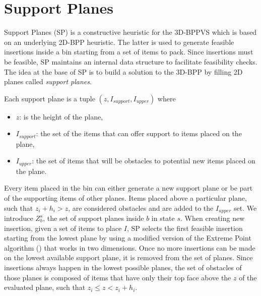 \section{Support Planes}
\label{sec:support_planes}%
Support Planes (SP) is a constructive heuristic for the 3D-BPPVS which is based on an underlying 2D-BPP heuristic. The latter is used to generate feasible insertions inside a bin starting from a set of items to pack.
Since insertions must be feasible, SP maintains an internal data structure to facilitate feasibility checks.
The idea at the base of SP is to build a solution to the 3D-BPP by filling 2D planes called \textit{support planes}.

Each support plane is a tuple $(z, I_{support}, I_{upper})$ where
\begin{itemize}
    \item $z$: is the height of the plane,
    \item $I_{support}$: the set of the items that can offer support to items placed on the plane,
    \item $I_{upper}$: the set of items that will be obstacles to potential new items placed on the plane.
\end{itemize}

Every item placed in the bin can either generate a new support plane or be part of the supporting items of other planes.
Items placed above a particular plane, such that $z_i + h_i > z$, are considered obstacles and are added to the $I_{upper}$ set.
We introduce $Z^s_b$, the set of support planes inside $b$ in state $s$.
When creating new insertion, given a set of items to place $I$, SP selects the first feasible insertion starting from the lowest plane by using a modified version of the Extreme Point algorithm (\cite{crainic2008extreme}) that works in two dimensions.
Once no more insertions can be made on the lowest available support plane, it is removed from the set of planes.
Since insertions always happen in the lowest possible planes, the set of obstacles of those planes is composed of items that have only their top face above the $z$ of the evaluated plane, such that $z_i \le z < z_i + h_i$.


